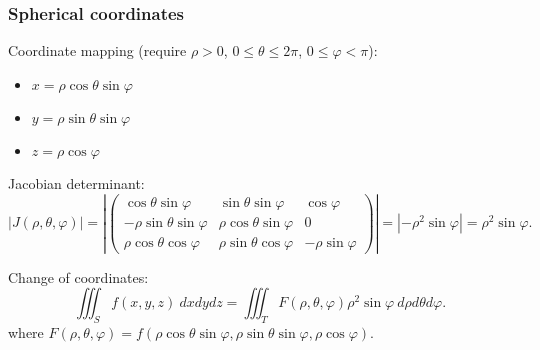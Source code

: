 \documentclass[aspectratio=169,handout]{beamer}
\newcommand{\abs}[1]{\left|#1\right|} %
\begin{document}
\begin{frame}
    \frametitle{Spherical coordinates}

    Coordinate mapping (require \(\rho>0\), \(0\leq \theta \leq 2\pi\), \(0\leq \varphi <\pi\)):
    \begin{itemize}
        \item \(x = \rho \cos \theta \sin \varphi\)
        \item \(y = \rho \sin \theta \sin \varphi\)
        \item \(z = \rho \cos \varphi\)
    \end{itemize}



    Jacobian determinant:
    \[
        \abs{J(\rho,\theta,\varphi)}
        = 
        \abs{\begin{pmatrix}
        \cos \theta \sin \varphi & \sin \theta \sin \varphi & \cos \varphi \\
        -\rho \sin \theta \sin \varphi & \rho \cos \theta \sin \varphi & 0 \\
        \rho \cos \theta \cos \varphi & \rho \sin \theta \cos \varphi & - \rho \sin \varphi
        \end{pmatrix}}
        = 
        \abs{- \rho^2 \sin \varphi}
        = \rho^2 \sin \varphi.
    \]

    Change of coordinates:
    \[
        \iiint_{S} f(x,y,z) \ dxdydz =  \iiint_{T}  F(\rho,\theta,\varphi) \rho^2 \sin \varphi  \ d\rho d\theta d\varphi.
    \]
    where \(F(\rho,\theta,\varphi) = f(\rho \cos \theta \sin \varphi, \rho \sin \theta \sin \varphi,   \rho \cos \varphi  ) \).


\end{frame}
\end{document}
